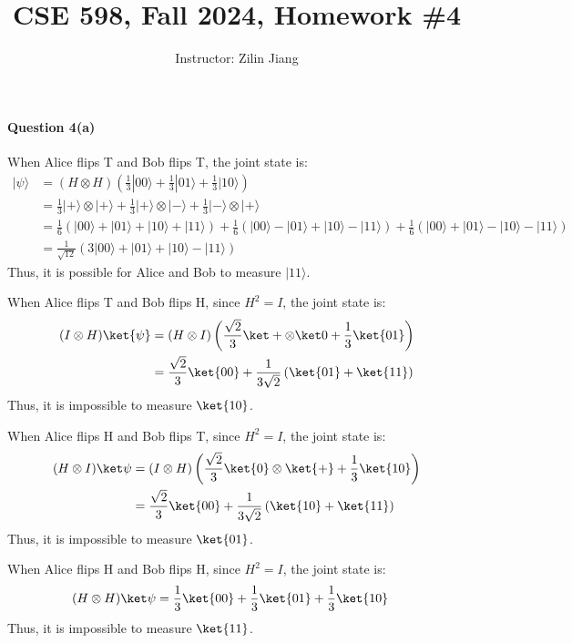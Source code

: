 \documentclass[12pt,answers]{exam}
\title{CSE 598, Fall 2024, Homework \#4}
\date{}
\author{Instructor: Zilin Jiang}
\theoremstyle{remark}
\begin{document}
\maketitle

\paragraph{Question 4(a)} When Alice flips T and Bob flips T, the joint state is:
\begin{align*}
  |\psi\rangle & = (H \otimes H)\left(\frac{1}{3} |00\rangle + \frac{1}{3} |01\rangle + \frac{1}{3} |10\rangle\right) \\
  & = \frac13 |+\rangle \otimes |+\rangle + \frac13 |+\rangle \otimes |-\rangle + \frac13 |-\rangle \otimes |+\rangle \\
  & = \frac{1}{6}\left( |00\rangle + |01\rangle + |10\rangle + |11\rangle \right) + \frac16 \left( |00\rangle - |01\rangle + |10\rangle - |11\rangle \right) + \frac16 \left( |00\rangle + |01\rangle - |10\rangle - |11\rangle \right) \\
  & = \frac{1}{\sqrt{12}} \left( 3 |00\rangle + |01\rangle + |10\rangle - |11\rangle \right)
\end{align*}
Thus, it is possible for Alice and Bob to measure \( |11\rangle \).

When Alice flips T and Bob flips H, since $H^2 = I$, the joint state is:
\begin{align*}
  (I \otimes H)\ket{\psi} & = (H \otimes I) \left(\frac{\sqrt2}{3}\ket+\otimes\ket0 + \frac13 \ket{01}\right) \\
  & = \frac{\sqrt2}{3}\ket{00} + \frac{1}{3\sqrt2}\left(\ket{01} + \ket{11}\right)
\end{align*}
Thus, it is impossible to measure $\ket{10}$.

When Alice flips H and Bob flips T, since $H^2 = I$, the joint state is:
\begin{align*}
  (H \otimes I)\ket\psi & = (I \otimes H)\left(\frac{\sqrt2}{3} \ket{0}\otimes\ket{+} + \frac13 \ket{10}\right) \\
  & = \frac{\sqrt2}{3} \ket{00} + \frac{1}{3\sqrt2}\left(\ket{10} + \ket{11}\right)
\end{align*}
Thus, it is impossible to measure $\ket{01}$.

When Alice flips H and Bob flips H, since $H^2 = I$, the joint state is:
\begin{align*}
  (H\otimes H)\ket\psi &= \frac13 \ket{00} + \frac13 \ket{01} + \frac13 \ket{10}
\end{align*}
Thus, it is impossible to measure $\ket{11}$.
\end{document}
